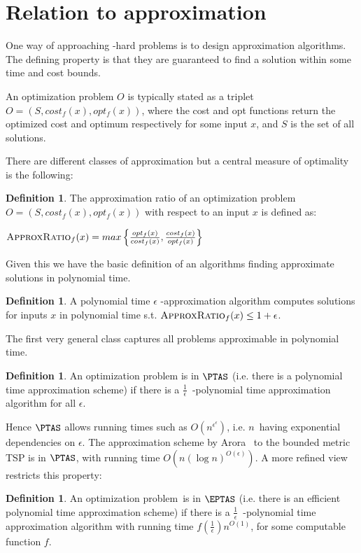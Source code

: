 \documentclass[a4paper,11pt]{report}
\theoremstyle{plain}
\theoremstyle{definition}
\newtheorem{defn}[thm]{Definition} %
\begin{document}
\section{Relation to approximation}
\label{sec:approx}
One way of approaching \NP-hard problems is to design approximation algorithms.
The defining property is that they are guaranteed to find a solution within some time and cost bounds.

An optimization problem $O$ is typically stated as a triplet $O = (S, cost_f(x), opt_f(x))$,
where the cost and opt functions return the optimized cost and optimum respectively for some input $x$, and $S$ is the set of all solutions.

There are different classes of approximation but a central measure of optimality is the following:

\begin{defn}
The approximation ratio of an optimization problem $O = (S, cost_f(x), opt_f(x))$ with respect to an input $x$ is defined as:

$\textsc{ApproxRatio}_f(x) = max \left\{ \frac{opt_f(x)}{cost_f(x)}, \frac{cost_f(x)}{opt_f(x)} \right\}$
\end{defn}

Given this we have the basic definition of an algorithms finding approximate solutions in polynomial time.

\begin{defn}
A polynomial time $\epsilon$ -approximation algorithm computes solutions for inputs $x$ in polynomial time s.t. $\textsc{ApproxRatio}_f(x) \leq 1 + \epsilon$.
\end{defn}

The first very general class captures all problems approximable in polynomial time.

\begin{defn}
An optimization problem is in $\PTAS$ (i.e. there is a polynomial time approximation scheme) if there is a $\frac{1}{\epsilon}$ -polynomial time approximation algorithm for all $\epsilon$.
\end{defn}

Hence $\PTAS$ allows running times such as $O(n^{\epsilon ^ \epsilon})$, i.e. $n$ having exponential dependencies on $\epsilon$.
The approximation scheme by Arora~\cite{ARORA96} to the bounded metric TSP is in $\PTAS$, with running time $O(n(\log n)^{O(\epsilon)})$.
A more refined view restricts this property:

\begin{defn}
An optimization problem is in $\EPTAS$ (i.e. there is an efficient polynomial time approximation scheme) if there is a $\frac{1}{\epsilon}$ -polynomial time approximation algorithm with 
running time $f(\frac{1}{\epsilon}) n^{O(1)}$, for some computable function $f$.
\end{defn}
\end{document}

